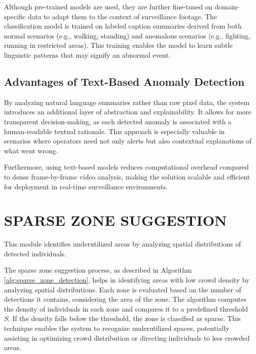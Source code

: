 Although pre-trained models are used, they are further fine-tuned on domain-specific data to adapt them to the context of surveillance footage. The classification model is trained on labeled caption summaries derived from both normal scenarios (e.g., walking, standing) and anomalous scenarios (e.g., fighting, running in restricted areas). This training enables the model to learn subtle linguistic patterns that may signify an abnormal event.

\subsection{Advantages of Text-Based Anomaly Detection}

By analyzing natural language summaries rather than raw pixel data, the system introduces an additional layer of abstraction and explainability. It allows for more transparent decision-making, as each detected anomaly is associated with a human-readable textual rationale. This approach is especially valuable in scenarios where operators need not only alerts but also contextual explanations of what went wrong.

Furthermore, using text-based models reduces computational overhead compared to dense frame-by-frame video analysis, making the solution scalable and efficient for deployment in real-time surveillance environments.

\section{\MakeUppercase{Sparse Zone Suggestion}}

This module identifies underutilized areas by analyzing spatial distributions of detected individuals.

The sparse zone suggestion process, as described in Algorithm \ref{alg:sparse_zone_detection}, helps in identifying areas with low crowd density by analyzing spatial distributions. Each zone is evaluated based on the number of detections it contains, considering the area of the zone. The algorithm computes the density of individuals in each zone and compares it to a predefined threshold $S$. If the density falls below the threshold, the zone is classified as sparse. This technique enables the system to recognize underutilized spaces, potentially assisting in optimizing crowd distribution or directing individuals to less crowded areas.



